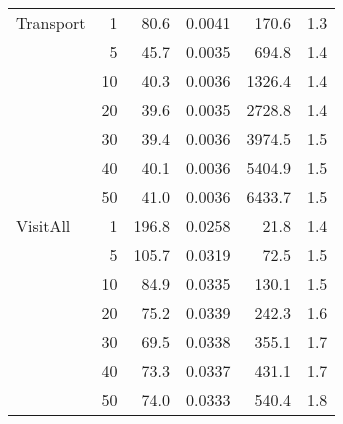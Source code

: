 \begin{table}[!h]
{\begin{tabular}{lrrrrr}
Transport & 1 &        80.6 &      0.0041 &               170.6 &                           1.3 \\
         & 5 &        45.7 &      0.0035 &               694.8 &                           1.4 \\
         & 10 &        40.3 &      0.0036 &              1326.4 &                           1.4 \\
         & 20 &        39.6 &      0.0035 &              2728.8 &                           1.4 \\
         & 30 &        39.4 &      0.0036 &              3974.5 &                           1.5 \\
         & 40 &        40.1 &      0.0036 &              5404.9 &                           1.5 \\
         & 50 &        41.0 &      0.0036 &              6433.7 &                           1.5 \\ \midrule
VisitAll & 1 &       196.8 &      0.0258 &                21.8 &                           1.4 \\
         & 5 &       105.7 &      0.0319 &                72.5 &                           1.5 \\
         & 10 &        84.9 &      0.0335 &               130.1 &                           1.5 \\
         & 20 &        75.2 &      0.0339 &               242.3 &                           1.6 \\
         & 30 &        69.5 &      0.0338 &               355.1 &                           1.7 \\
         & 40 &        73.3 &      0.0337 &               431.1 &                           1.7 \\
         & 50 &        74.0 &      0.0333 &               540.4 &                           1.8 \\
\bottomrule
\end{tabular}
}
\end{table}
